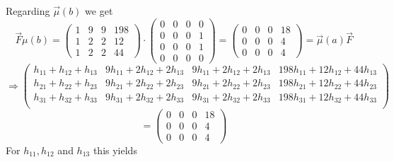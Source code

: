         Regarding $\overrightarrow{\mu}(b)$ we get
        \[ \overrightarrow{F} \mu(b) = 
            \begin{pmatrix}
                1 & 9 & 9 & 198 \\
                1 & 2 & 2 & 12  \\
                1 & 2 & 2 & 44
            \end{pmatrix} \cdot \begin{pmatrix}
                    0 & 0 & 0 & 0 \\
                    0 & 0 & 0 & 1 \\
                    0 & 0 & 0 & 1 \\
                    0 & 0 & 0 & 0
            \end{pmatrix} = \begin{pmatrix}
                0 & 0 & 0 & 18 \\
                0 & 0 & 0 & 4 \\
                0 & 0 & 0 & 4
            \end{pmatrix}  = \overrightarrow{\mu}(a) \overrightarrow{F} 
        \] 
        \[\Rightarrow 
             \begin{pmatrix}
                h_{11} + h_{12} + h_{13} & 9h_{11}+2h_{12}+2h_{13} & 9h_{11}+2h_{12}+2h_{13} & 198h_{11}+12h_{12}+44h_{13} \\
                h_{21} + h_{22} + h_{23} & 9h_{21}+2h_{22}+2h_{23} & 9h_{21}+2h_{22}+2h_{23} & 198h_{21}+12h_{22}+44h_{23}  \\
                h_{31} + h_{32} + h_{33} & 9h_{31}+2h_{32}+2h_{33} & 9h_{31}+2h_{32}+2h_{33} & 198h_{31}+12h_{32}+44h_{33}  \\
            \end{pmatrix}  
        \]
        \[ = 
            \begin{pmatrix}
                0 & 0 & 0 & 18 \\
                0 & 0 & 0 & 4 \\
                0 & 0 & 0 & 4
            \end{pmatrix}
        \]
        For $h_{11}, h_{12}$ and $h_{13}$ this yields
